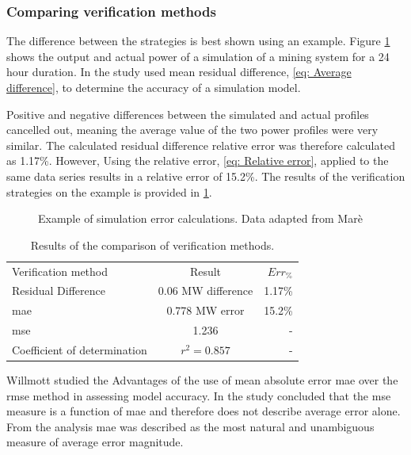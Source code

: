  		\subsubsection{Comparing verification methods}
 		The difference between the strategies is best shown using an example. Figure \cref{fig:Philipp Difference verify} shows the output and actual power of a simulation of a mining system for a 24 hour duration. In the study \cite{Mare2016PhD} used mean residual difference, \cref{eq: Average difference}, to determine the accuracy of a simulation model.
 		\par 
 		 Positive and negative differences between the simulated and actual profiles cancelled out, meaning the average value of the two power profiles were very similar. The calculated residual difference relative error was therefore calculated as 1.17\%. However, Using the relative error, \cref{eq: Relative error}, applied to the same data series results in a relative error of 15.2\%. The results of the verification strategies on the example is provided in \cref{Philip verification table}. 
 		
 	\begin{figure}[h!]
 		\centering
 		
 		\caption[Example of simulation error calculations.]{Example of simulation error calculations. Data adapted from Marè \cite{Mare2016PhD}}
 		\label{fig:Philipp Difference verify}
 	\end{figure}
 
 \begin{table}[h!]
 	\label{Philip verification table}
 	\centering
 	\begin{tabular}{lcr}
 		\hline
 		Verification method & Result & $Err_{\%}$\\
 		\hhline{===}
 		Residual Difference          & 0.06 MW difference  & 1.17\% \\
 		\gls{mae} 					 & 0.778 MW error & 15.2\% \\
 		\gls{mse} 				     & 1.236    & -\\
 		Coefficient of determination & $r^2 =0.857$   & -\\
 		\hline
 	\end{tabular} 
 \caption{Results of the comparison of verification methods.}
 \end{table}
 
 	\par 
 	Willmott \cite{willmott2005advantages} studied the Advantages of the use of mean absolute error \gls{mae} over the \gls{rmse} method in assessing model accuracy. In the study \cite{willmott2005advantages} concluded that the \gls{mse} measure is a function of \gls{mae} and therefore does not describe average error alone. From the analysis \gls{mae} was described as the most natural and unambiguous measure of average error magnitude.

